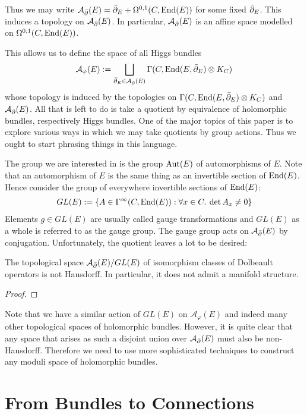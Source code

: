 \documentclass[12pt]{ociamthesis}  %
\begin{document}
Thus we may write $\mathcal A_{\bar{\partial}} (E) = {\bar{\partial}}_E + \Omega^{0,1}(C,\operatorname{End}(E))$
for some fixed ${\bar{\partial}}_E$. This induces a topology on $\mathcal A_{\bar{\partial}} (E)$.
In particular, $\mathcal A_{\bar{\partial}} (E)$ is an affine space modelled on
$\Omega^{0,1}(C,\operatorname{End}(E))$.

This allows us to define the space of all Higgs bundles
\begin{align*}
  \mathcal A_\varphi(E) := \bigsqcup_{{\bar{\partial}}_E \in \mathcal A_{\bar{\partial}} (E)} \Gamma(C,\operatorname{End}(E,{\bar{\partial}}_E)\otimes K_C)
\end{align*}
whose topology is induced by the topologies on
$\Gamma(C,\operatorname{End}(E,{\bar{\partial}}_E)\otimes K_C)$ and $\mathcal A_{\bar{\partial}} (E)$.
All that is left to do is take a quotient by equivalence of holomorphic
bundles, respectively Higgs bundles. One of the major topics of this
paper is to explore various ways in which we may take quotients by
group actions. Thus we ought to start phrasing things in this language.

The group we are interested in is the group $\operatorname{Aut}(E)$ of automorphisms
of $E$. Note that an automorphism of $E$ is the same thing as
an invertible section of $\operatorname{End}(E)$. Hence consider the group
of everywhere invertible sections of $\operatorname{End}(E)$:
\begin{align*}
  GL(E) := \{A \in \Gamma^\infty(C,\operatorname{End}(E)) : \forall x \in C.\:\det A_x \neq 0\}
\end{align*}
Elements $g\in GL(E)$ are usually called gauge transformations and
$GL(E)$ as a whole is referred to as the gauge group.
The gauge group acts on $\mathcal A_{\bar{\partial}}(E)$ by conjugation.
Unfortunately, the quotient leaves a lot to be desired:
\begin{lemma}
  The topological space $\mathcal A_{\bar{\partial}} (E)/GL(E)$ of isomorphism classes of
  Dolbeault operators is not Hausdorff. In particular, it does not
  admit a manifold structure.
  \begin{proof}
    \missingproof
  \end{proof}
\end{lemma}

Note that we have a similar action of $GL(E)$ on $\mathcal A_\varphi(E)$ and
indeed many other topological spaces of holomorphic bundles. However,
it is quite clear that any space that arises as such a disjoint union
over $\mathcal A_{\bar{\partial}} (E)$ must also be non-Hausdorff. Therefore we need
to use more sophisticated techniques to construct any moduli
space of holomorphic bundles.

\section{From Bundles to Connections}
\end{document}
